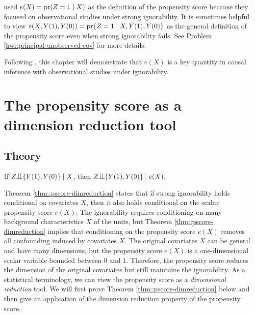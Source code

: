 
\citet{rosenbaum1983central} used  $e(X) = \textup{pr}(Z=1 \mid X)$ as the definition of the propensity score because they focused on observational studies under strong ignorability. It is sometimes helpful to view $e(X, Y(1), Y(0)   ) = \textup{pr}\{  Z=1\mid X, Y(1), Y(0)  \}$ as the general definition of the propensity score even when strong ignorability fails.  See Problem \ref{hw::principal-unobserved-cov} for more details. 

Following \citet{rosenbaum1983central}, this chapter will demonstrate that $e(X)$ is a key quantity in causal inference with observational studies under ignorability.

 


\section{The propensity score as a dimension reduction tool}

\subsection{Theory}

\begin{theorem}
\label{thm::pscore-dimreduction}
If $Z\ind \{ Y(1), Y(0)  \} \mid X$, then
$
Z\ind \{ Y(1), Y(0)  \} \mid e(X).
$
\end{theorem}

Theorem \ref{thm::pscore-dimreduction} states that if strong ignorability holds conditional on covariates $X$, then it also holds conditional on the scalar propensity score $e(X)$. 
The ignorability requires conditioning on many background characteristics $X$ of the units, but Theorem \ref{thm::pscore-dimreduction} implies that conditioning on the propensity score $e(X)$ removes all confounding induced by covariates $X.$ The original covariates $X$ can be general and have many dimensions, but the propensity score $e(X)$ is a one-dimensional scalar variable bounded between $0$ and $1$. Therefore, the propensity score reduces the dimension of the original covariates but still maintains the ignorability. As a statistical terminology, we can view the propensity score as a {\it dimensional reduction} tool. We will first prove Theorem \ref{thm::pscore-dimreduction}  below and then give an application of the dimension reduction property of the propensity score. 





